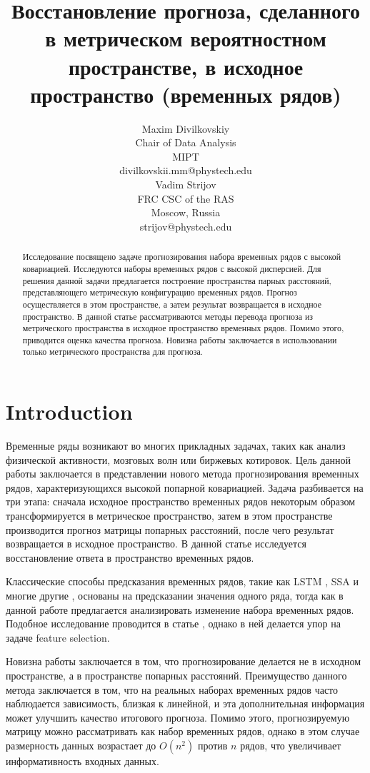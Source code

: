 \documentclass{article}
\title{Восстановление прогноза, сделанного в метрическом вероятностном пространстве, в исходное пространство (временных рядов)}
\author{ Maxim Divilkovskiy \\
	Chair of Data Analysis\\
	MIPT\\
	divilkovskii.mm@phystech.edu \\
	\And
	Vadim Strijov \\
	FRC CSC of the RAS\\
	Moscow, Russia\\
        strijov@phystech.edu \\
}
\date{}
\begin{document}
\maketitle

\begin{abstract}
	Исследование посвящено задаче прогнозирования набора временных рядов с высокой ковариацией. Исследуются наборы временных рядов с высокой дисперсией. Для решения данной задачи предлагается построение пространства парных расстояний, представляющего метрическую конфигурацию временных рядов. Прогноз осуществляется в этом пространстве, а затем результат возвращается в исходное пространство.
	В данной статье рассматриваются методы перевода прогноза из метрического пространства в исходное пространство временных рядов. Помимо этого, приводится оценка качества прогноза. Новизна работы заключается в использовании только метрического пространства для прогноза.


\end{abstract}



\section{Introduction}
	Временные ряды возникают во многих прикладных задачах, таких как анализ физической активности, мозговых волн или биржевых котировок. Цель данной работы заключается в представлении нового метода прогнозирования временных рядов, характеризующихся высокой попарной ковариацией. Задача разбивается на три этапа: сначала исходное пространство временных рядов некоторым образом трансформируется в метрическое пространство, затем в этом пространстве производится прогноз матрицы попарных расстояний, после чего результат возвращается в исходное пространство. В данной статье исследуется восстановление ответа в пространство временных рядов.
		
	Классические способы предсказания временных рядов, такие как LSTM \cite{LSTM}, SSA \cite{SSA} и многие другие \cite{Biosignals}, \cite{boyd2017multiperiod} основаны на предсказании значения одного ряда, тогда как в данной работе предлагается анализировать изменение набора временных рядов. Подобное исследование проводится в статье \cite{MulticorrelatedQuadratic}, однако в ней делается упор на задаче feature selection.
	
	Новизна работы заключается в том, что прогнозирование делается не в исходном пространстве, а в пространстве попарных расстояний. Преимущество данного метода заключается в том, что на реальных наборах временных рядов часто наблюдается зависимость, близкая к линейной, и эта дополнительная информация может улучшить качество итогового прогноза. Помимо этого, прогнозируемую матрицу можно рассматривать как набор временных рядов, однако в этом случае размерность данных возрастает до $O(n^2)$ против $n$ рядов, что увеличивает информативность входных данных.
	
\end{document}

